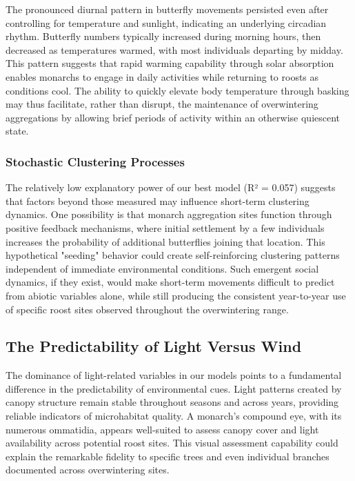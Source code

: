 The pronounced diurnal pattern in butterfly movements persisted even after controlling for temperature and sunlight, indicating an underlying circadian rhythm. Butterfly numbers typically increased during morning hours, then decreased as temperatures warmed, with most individuals departing by midday. This pattern suggests that rapid warming capability through solar absorption enables monarchs to engage in daily activities while returning to roosts as conditions cool. The ability to quickly elevate body temperature through basking may thus facilitate, rather than disrupt, the maintenance of overwintering aggregations by allowing brief periods of activity within an otherwise quiescent state.

\subsubsection{Stochastic Clustering Processes}

The relatively low explanatory power of our best model (R² = 0.057) suggests that factors beyond those measured may influence short-term clustering dynamics. One possibility is that monarch aggregation sites function through positive feedback mechanisms, where initial settlement by a few individuals increases the probability of additional butterflies joining that location. This hypothetical "seeding" behavior could create self-reinforcing clustering patterns independent of immediate environmental conditions. Such emergent social dynamics, if they exist, would make short-term movements difficult to predict from abiotic variables alone, while still producing the consistent year-to-year use of specific roost sites observed throughout the overwintering range.

\subsection{The Predictability of Light Versus Wind}

The dominance of light-related variables in our models points to a fundamental difference in the predictability of environmental cues. Light patterns created by canopy structure remain stable throughout seasons and across years, providing reliable indicators of microhabitat quality. A monarch's compound eye, with its numerous ommatidia, appears well-suited to assess canopy cover and light availability across potential roost sites. This visual assessment capability could explain the remarkable fidelity to specific trees and even individual branches documented across overwintering sites.

